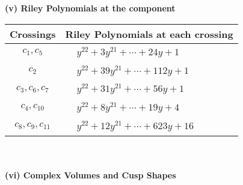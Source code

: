 \documentclass[1p]{elsarticle_modified}
\theoremstyle{definition}
\begin{document}
\flushleft \textbf{(v) Riley Polynomials at the component}\newline \\
\begin{tabular}{m{50pt}|m{274pt}}
Crossings & \hspace{64pt}Riley Polynomials at each crossing \\
\hline $$\begin{aligned}c_{1},c_{5}\end{aligned}$$&$\begin{aligned}
&y^{22}+3 y^{21}+\cdots+24 y+1
\end{aligned}$\\
\hline $$\begin{aligned}c_{2}\end{aligned}$$&$\begin{aligned}
&y^{22}+39 y^{21}+\cdots+112 y+1
\end{aligned}$\\
\hline $$\begin{aligned}c_{3},c_{6},c_{7}\end{aligned}$$&$\begin{aligned}
&y^{22}+31 y^{21}+\cdots+56 y+1
\end{aligned}$\\
\hline $$\begin{aligned}c_{4},c_{10}\end{aligned}$$&$\begin{aligned}
&y^{22}+8 y^{21}+\cdots+19 y+4
\end{aligned}$\\
\hline $$\begin{aligned}c_{8},c_{9},c_{11}\end{aligned}$$&$\begin{aligned}
&y^{22}+12 y^{21}+\cdots+623 y+16
\end{aligned}$\\
\hline
\end{tabular}\\~\\
\newpage\flushleft \textbf{(vi) Complex Volumes and Cusp Shapes}
\end{document}
